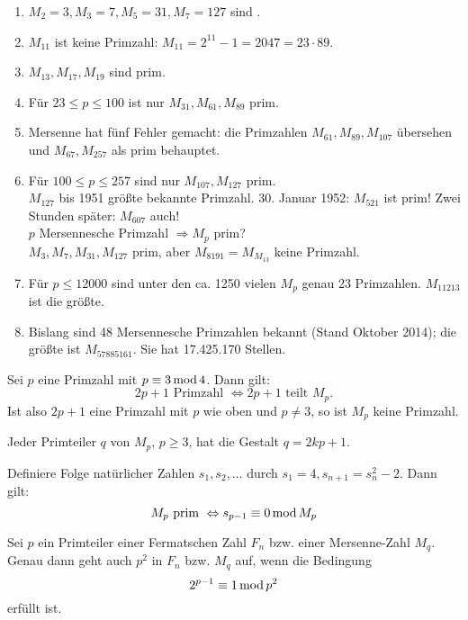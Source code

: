 \begin{enumerate}[(1)]
	\item $M_2 = 3, M_3 = 7, M_5 = 31, M_7 = 127$ sind . 
	\item $M_{11}$ ist keine Primzahl: $M_{11} = 2^{11} - 1 = 2047 = 23 \cdot 89$.
	\item $M_{13}, M_{17}, M_{19}$ sind prim.
	\item Für $23 \leq p \leq 100$ ist nur $M_{31}, M_{61}, M_{89}$ prim.
	\item Mersenne hat fünf Fehler gemacht: die Primzahlen $M_{61}, M_{89}, M_{107}$ übersehen und $M_{67}, M_{257}$ als prim behauptet.
	\item Für $100 \leq p \leq 257$ sind nur $M_{107}, M_{127}$ prim. \\
	$M_{127}$ bis 1951 größte bekannte Primzahl. 30. Januar 1952: $M_{521}$ ist prim! Zwei Stunden später: $M_{607}$ auch! \\
	$p$ Mersennesche Primzahl $\Rightarrow M_p$ prim? \\
	$M_3, M_7, M_{31}, M_{127}$ prim, aber $M_{8191} = M_{M_{13}}$ keine Primzahl.
	\item Für $p \leq 12000$ sind unter den ca. 1250 vielen $M_p$ genau 23 Primzahlen. $M_{11213}$ ist die größte.
	\item Bislang sind 48 Mersennesche Primzahlen bekannt (Stand Oktober 2014); die größte ist $M_{57885161}$. Sie hat 17.425.170 Stellen.
\end{enumerate}

\setcounter{countfalko}{3}
\begin{falko} \label{F7.4}
	Sei $p$ eine Primzahl mit $p \equiv 3 \operatorname{mod} 4$. Dann gilt:
	\[2p + 1 \text{ Primzahl } \Leftrightarrow 2p+1 \text{ teilt } M_p. \]
	Ist also $2p+1$ eine Primzahl mit $p$ wie oben und $p \neq 3$, so ist $M_p$ keine Primzahl.
\end{falko}

	Jeder Primteiler $q$ von $M_p$, $p \geq 3$, hat die Gestalt $q = 2kp + 1$.
	
\begin{falko} \label{F7.5}
	Definiere Folge natürlicher Zahlen $s_1, s_2, \dots$ durch $s_1 = 4, s_{n+1} = s_n^2 - 2$. Dann gilt: 
	\[ M_p \text{ prim } \Leftrightarrow s_{p-1} \equiv 0 \operatorname{mod} M_p \]
\end{falko}

\setcounter{countfalko}{2}
\begin{falko} \label{F7.3}
	Sei $p$ ein Primteiler einer Fermatschen Zahl $F_n$ bzw. einer Mersenne-Zahl $M_q$. Genau dann geht auch $p^2$ in $F_n$ bzw. $M_q$ auf, wenn die Bedingung 
	\begin{equation}
		2^{p-1} \equiv 1 \operatorname{mod} p^2 \label{eq_W}
	\end{equation}
	erfüllt ist.
\end{falko}

